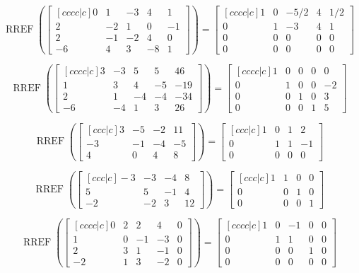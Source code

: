 \documentclass{article}
\DeclareMathOperator{\RREF}{RREF}
\begin{document}
\[\RREF\left( \begin{bmatrix}[cccc|c]
0 & 1 & -3 & 4 &1  \\
2 & -2 &1 & 0 & -1 \\
2 & -1 & -2 & 4 & 0\\
-6 & 4 & 3 & -8 & 1
\end{bmatrix} \right) 
= \begin{bmatrix}[cccc|c] 
1 & 0 & -5/2 & 4 &1/2  \\
0 & 1 & -3 & 4 & 1 \\
0 & 0 & 0 & 0 & 0\\
0 & 0 & 0 & 0 & 0
\end{bmatrix}
\]


\[\RREF\left( \begin{bmatrix}[cccc|c]
3 & -3 & 5 & 5 & 46 \\
 1 & 3 & 4 & -5 & -19\\
 2 & 1 & -4 & -4 & -34 \\
 -6 & -4 & 1 & 3 & 26
\end{bmatrix} \right) 
= \begin{bmatrix}[cccc|c]
1 & 0 & 0 & 0 & 0\\ 
0 & 1 & 0 & 0 & -2\\
0 & 0 & 1 & 0 &3\\
0 & 0 & 0 & 1 & 5
\end{bmatrix}\]


\[\RREF\left( \begin{bmatrix}[ccc|c]
3 & -5 & -2 &11 \\
-3 & -1 & -4 & -5\\
4 & 0 & 4 & 8
\end{bmatrix} \right) 
= \begin{bmatrix}[ccc|c]
1 & 0 &1 & 2 \\
0 & 1 & 1 & -1 \\
0 & 0 & 0 & 0 
\end{bmatrix}\]


\[\RREF\left( \begin{bmatrix}[ccc|c]
-3 & -3 & -4 & 8 \\
5 & 5 & -1 & 4 \\
-2 & -2 & 3 & 12 
\end{bmatrix} \right) 
= \begin{bmatrix}[ccc|c] 
1 & 1 & 0 & 0 \\ 
0 & 0 & 1 & 0 \\
 0 & 0 & 0 & 1
\end{bmatrix}
\]


\[\RREF\left( \begin{bmatrix}[cccc|c]
0 & 2 & 2 & 4 &0  \\
1 & 0 & -1 & -3 & 0 \\
2 & 3 & 1 & -1 & 0\\
-2 & 1 & 3 & -2 & 0
\end{bmatrix} \right) 
= \begin{bmatrix}[cccc|c] 
1 & 0 & -1 & 0 &0  \\
0 & 1 & 1 & 0 & 0 \\
0 & 0 & 0 & 1 & 0\\
0 & 0 & 0 & 0 & 0
\end{bmatrix}
\]
\end{document}
